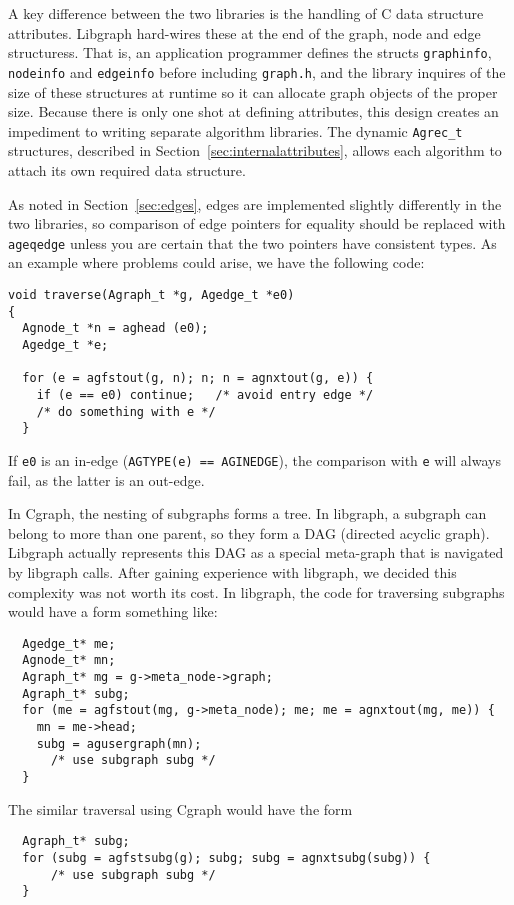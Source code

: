 \documentclass[11pt,letterpaper]{article}
\begin{document}
A key difference between the two libraries is the handling of
C data structure attributes.  Libgraph hard-wires these
at the end of the graph, node and edge structuress.  That is,
an application programmer defines the structs {\tt graphinfo}, {\tt nodeinfo}
and {\tt edgeinfo} before including {\tt graph.h}, and the library inquires of
the size of these structures at runtime so it can allocate graph
objects of the proper size.  Because there is only one shot at
defining attributes, this design creates an impediment to writing
separate algorithm libraries.
The dynamic \verb"Agrec_t" structures, described in Section~\ref{sec:internalattributes}, 
allows each algorithm to attach its own required data structure.

As noted in Section~\ref{sec:edges}, edges are implemented slightly
differently in the two libraries, so comparison of edge pointers for
equality should be replaced with \verb"ageqedge" unless you are certain
that the two pointers have consistent types. As an example where problems
could arise, we have the following code:
\begin{verbatim}
void traverse(Agraph_t *g, Agedge_t *e0)
{
  Agnode_t *n = aghead (e0);
  Agedge_t *e;
    
  for (e = agfstout(g, n); n; n = agnxtout(g, e)) {
    if (e == e0) continue;   /* avoid entry edge */
    /* do something with e */
  }
\end{verbatim}
If \verb"e0" is an in-edge (\verb"AGTYPE(e) == AGINEDGE"), the comparison
with \verb"e" will always fail, as the latter is an out-edge.

In Cgraph, the nesting of subgraphs forms a tree.
In libgraph, a subgraph can belong to more than one parent,
so they form a DAG (directed acyclic graph). Libgraph
actually represents this DAG as a special meta-graph
that is navigated by libgraph calls.  After gaining
experience with libgraph, we decided this complexity
was not worth its cost. In libgraph, the code for traversing
subgraphs would have a form something like\label{subg}:
\begin{verbatim}
  Agedge_t* me;
  Agnode_t* mn;
  Agraph_t* mg = g->meta_node->graph;
  Agraph_t* subg;
  for (me = agfstout(mg, g->meta_node); me; me = agnxtout(mg, me)) {
    mn = me->head;
    subg = agusergraph(mn);
      /* use subgraph subg */
  }
\end{verbatim}
The similar traversal using Cgraph would have the form
\begin{verbatim}
  Agraph_t* subg;
  for (subg = agfstsubg(g); subg; subg = agnxtsubg(subg)) {
      /* use subgraph subg */
  }
\end{verbatim}
\end{document}
